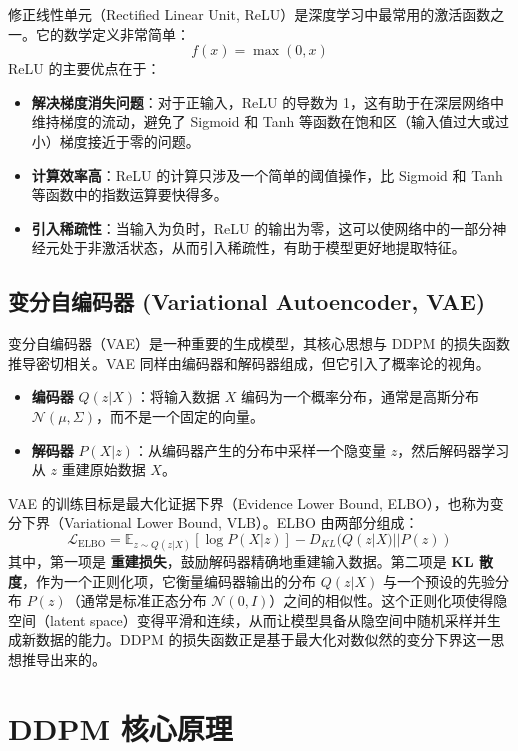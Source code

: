 \documentclass{ctexart}
\begin{document}
修正线性单元（Rectified Linear Unit, ReLU）是深度学习中最常用的激活函数之一。它的数学定义非常简单：
$$ f(x) = \max(0, x) $$
ReLU 的主要优点在于：
\begin{itemize}
    \item \textbf{解决梯度消失问题}：对于正输入，ReLU 的导数为 1，这有助于在深层网络中维持梯度的流动，避免了 Sigmoid 和 Tanh 等函数在饱和区（输入值过大或过小）梯度接近于零的问题。
    \item \textbf{计算效率高}：ReLU 的计算只涉及一个简单的阈值操作，比 Sigmoid 和 Tanh 等函数中的指数运算要快得多。
    \item \textbf{引入稀疏性}：当输入为负时，ReLU 的输出为零，这可以使网络中的一部分神经元处于非激活状态，从而引入稀疏性，有助于模型更好地提取特征。
\end{itemize}

\subsection{变分自编码器 (Variational Autoencoder, VAE)}

变分自编码器（VAE）是一种重要的生成模型，其核心思想与 DDPM 的损失函数推导密切相关。VAE 同样由编码器和解码器组成，但它引入了概率论的视角。
\begin{itemize}
    \item \textbf{编码器} $Q(z|X)$：将输入数据 $X$ 编码为一个概率分布，通常是高斯分布 $\mathcal{N}(\mu, \Sigma)$，而不是一个固定的向量。
    \item \textbf{解码器} $P(X|z)$：从编码器产生的分布中采样一个隐变量 $z$，然后解码器学习从 $z$ 重建原始数据 $X$。
\end{itemize}

VAE 的训练目标是最大化证据下界（Evidence Lower Bound, ELBO），也称为变分下界（Variational Lower Bound, VLB）。ELBO 由两部分组成：
$$ \mathcal{L}_{\text{ELBO}} = \mathbb{E}_{z \sim Q(z|X)}[\log P(X|z)] - D_{KL}(Q(z|X) || P(z)) $$
其中，第一项是 \textbf{重建损失}，鼓励解码器精确地重建输入数据。第二项是 \textbf{KL 散度}，作为一个正则化项，它衡量编码器输出的分布 $Q(z|X)$ 与一个预设的先验分布 $P(z)$（通常是标准正态分布 $\mathcal{N}(0, I)$）之间的相似性。这个正则化项使得隐空间（latent space）变得平滑和连续，从而让模型具备从隐空间中随机采样并生成新数据的能力。DDPM 的损失函数正是基于最大化对数似然的变分下界这一思想推导出来的。

\section{DDPM 核心原理}
\end{document}
